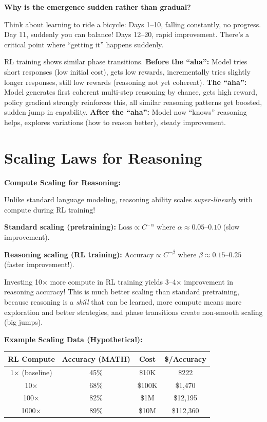 \begin{chapterenv}
\textbf{Why is the emergence sudden rather than gradual?}

Think about learning to ride a bicycle: Days 1--10, falling constantly, no progress. Day 11, suddenly you can balance! Days 12--20, rapid improvement. There's a critical point where ``getting it'' happens suddenly.

RL training shows similar phase transitions. \textbf{Before the ``aha'':} Model tries short responses (low initial cost), gets low rewards, incrementally tries slightly longer responses, still low rewards (reasoning not yet coherent). \textbf{The ``aha'':} Model generates first coherent multi-step reasoning by chance, gets high reward, policy gradient strongly reinforces this, all similar reasoning patterns get boosted, sudden jump in capability. \textbf{After the ``aha'':} Model now ``knows'' reasoning helps, explores variations (how to reason better), steady improvement.

\section{Scaling Laws for Reasoning}

\begin{infobox}
\textbf{Compute Scaling for Reasoning:}

Unlike standard language modeling, reasoning ability scales \textit{super-linearly} with compute during RL training!

\textbf{Standard scaling (pretraining):} $\text{Loss} \propto C^{-\alpha}$ where $\alpha \approx 0.05$--$0.10$ (slow improvement).

\textbf{Reasoning scaling (RL training):} $\text{Accuracy} \propto C^{-\beta}$ where $\beta \approx 0.15$--$0.25$ (faster improvement!).

Investing 10$\times$ more compute in RL training yields 3--4$\times$ improvement in reasoning accuracy! This is much better scaling than standard pretraining, because reasoning is a \textit{skill} that can be learned, more compute means more exploration and better strategies, and phase transitions create non-smooth scaling (big jumps).
\end{infobox}

\textbf{Example Scaling Data (Hypothetical):}

\begin{center}
\begin{tabular}{cccc}
\toprule
\textbf{RL Compute} & \textbf{Accuracy (MATH)} & \textbf{Cost} & \textbf{\$/Accuracy} \\
\midrule
1$\times$ (baseline) & 45\% & \$10K & \$222 \\
10$\times$ & 68\% & \$100K & \$1,470 \\
100$\times$ & 82\% & \$1M & \$12,195 \\
1000$\times$ & 89\% & \$10M & \$112,360 \\
\bottomrule
\end{tabular}
\end{center}


\end{chapterenv}
